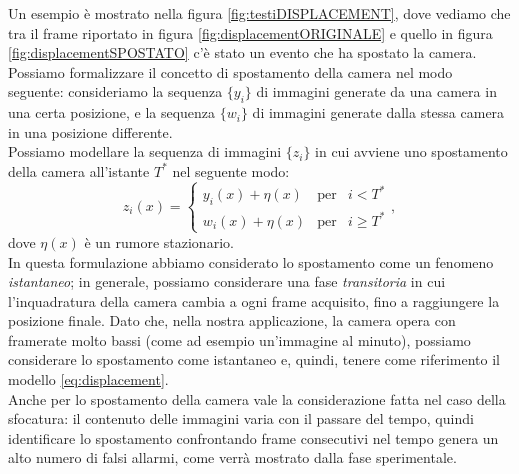 \noindent Un esempio \`e mostrato nella figura \ref{fig:testiDISPLACEMENT}, dove vediamo che tra il frame riportato in figura \ref{fig:displacementORIGINALE} e quello in figura \ref{fig:displacementSPOSTATO} c'\`e stato un evento che ha spostato la camera.
Possiamo formalizzare il concetto di spostamento della camera nel modo seguente: consideriamo la sequenza $\{y_i\}$ di immagini generate da una camera in una certa posizione, e la sequenza $\{w_i\}$ di immagini generate dalla stessa camera in una posizione differente.\\
Possiamo modellare la sequenza di immagini $\{z_i\}$ in cui avviene uno spostamento della camera all'istante $T^*$ nel seguente modo:
\begin{equation}
\label{eq:displacement}
z_i(x)  = \left\{ \begin{array}{rcl}
	y_i(x) + \eta(x) & \mbox{per} & i < T^* \\
	w_i(x) + \eta(x) & \mbox{per} & i \geqslant T^*
	\end{array}\right. ,
\end{equation}
dove $\eta(x)$ \`e un rumore stazionario.\\
In questa formulazione abbiamo considerato lo spostamento come un fenomeno \textit{istantaneo};
in generale, possiamo considerare una fase \textit{transitoria} in cui l'inquadratura della camera cambia a ogni \gls{frame} acquisito, fino a raggiungere la posizione finale. 
Dato che, nella nostra applicazione, la camera opera con \gls{framerate} molto bassi (come ad esempio un'immagine al minuto), possiamo considerare lo spostamento come istantaneo e, quindi, tenere come riferimento il modello \eqref{eq:displacement}.\\
Anche per lo spostamento della camera vale la considerazione fatta nel caso della sfocatura: il contenuto delle immagini varia con il passare del tempo, quindi identificare lo spostamento confrontando frame consecutivi nel tempo genera un alto numero di falsi allarmi, come verr\`a mostrato dalla fase sperimentale.
